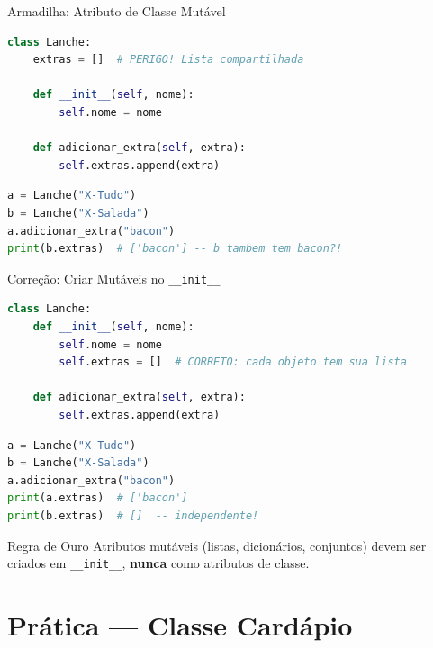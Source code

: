 \documentclass[aspectratio=169]{beamer}
\begin{document}
\begin{frame}{Armadilha: Atributo de Classe Mutável}
  \begin{lstlisting}[language=Python]
class Lanche:
    extras = []  # PERIGO! Lista compartilhada

    def __init__(self, nome):
        self.nome = nome

    def adicionar_extra(self, extra):
        self.extras.append(extra)
  \end{lstlisting}

  \begin{lstlisting}[language=Python]
a = Lanche("X-Tudo")
b = Lanche("X-Salada")
a.adicionar_extra("bacon")
print(b.extras)  # ['bacon'] -- b tambem tem bacon?!
  \end{lstlisting}
\end{frame}

\begin{frame}{Correção: Criar Mutáveis no \texttt{\_\_init\_\_}}
  \begin{lstlisting}[language=Python]
class Lanche:
    def __init__(self, nome):
        self.nome = nome
        self.extras = []  # CORRETO: cada objeto tem sua lista

    def adicionar_extra(self, extra):
        self.extras.append(extra)
  \end{lstlisting}

  \begin{lstlisting}[language=Python]
a = Lanche("X-Tudo")
b = Lanche("X-Salada")
a.adicionar_extra("bacon")
print(a.extras)  # ['bacon']
print(b.extras)  # []  -- independente!
  \end{lstlisting}

  \begin{alertblock}{Regra de Ouro}
    Atributos mutáveis (listas, dicionários, conjuntos) devem ser
    criados em \texttt{\_\_init\_\_}, \textbf{nunca} como atributos de classe.
  \end{alertblock}
\end{frame}

\section{Prática --- Classe Cardápio}
\end{document}
